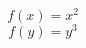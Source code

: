 \documentclass{article}
\begin{document}
\begin{equation}
  f(x) = x^2
\end{equation}
\begin{equation}
  f(y) = y^3
\end{equation}
\end{document}
